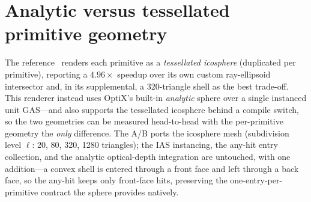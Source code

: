 \section{Analytic versus tessellated primitive geometry}
\label{sec:icosphere}

The reference~\cite{DSYG} renders each primitive as a \emph{tessellated icosphere} (duplicated per
primitive), reporting a $4.96\times$ speedup over its own custom ray-ellipsoid intersector and, in its
supplemental, a \num{320}-triangle shell as the best trade-off. This renderer instead uses OptiX's built-in \emph{analytic} sphere
over a single instanced unit GAS---and also supports the tessellated icosphere behind a compile switch,
so the two geometries can be measured head-to-head with the per-primitive geometry the \emph{only}
difference. The A/B ports the icosphere mesh (subdivision level $\ell$: \num{20}, \num{80}, \num{320},
\num{1280} triangles); the IAS instancing, the any-hit entry collection,
and the analytic optical-depth integration are untouched, with one addition---a convex shell is
entered through a front face and left through a back face, so the any-hit keeps only front-face hits,
preserving the one-entry-per-primitive contract the sphere provides natively.

